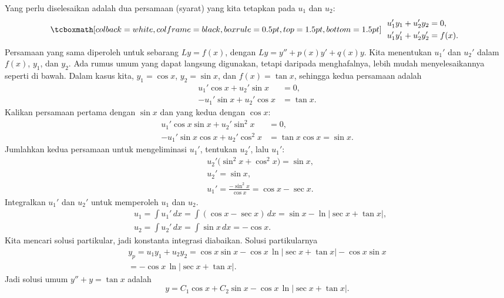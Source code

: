 Yang perlu diselesaikan adalah dua persamaan (syarat) yang kita tetapkan pada $u_1$ dan $u_2$:
\begin{equation*}
\mybxbg{~~
\begin{aligned}
& u_1' y_1 + u_2' y_2 = 0 ,\\
& u_1' y_1' + u_2' y_2' = f(x) .
\end{aligned}
~~}
\end{equation*}
Persamaan yang sama diperoleh untuk sebarang $Ly = f(x)$, dengan $Ly = y''+p(x)y'+q(x)y$. Kita menentukan $u_1'$ dan $u_2'$ dalam $f(x)$, $y_1$, dan $y_2$. Ada rumus umum yang dapat langsung digunakan, tetapi daripada menghafalnya, lebih mudah menyelesaikannya seperti di bawah. Dalam kasus kita, $y_1 = \cos x$, $y_2 = \sin x$, dan $f(x) = \tan x$, sehingga kedua persamaan adalah
\begin{equation*}
\begin{aligned}
u_1' \cos x + u_2' \sin x &= 0 ,\\
-u_1' \sin x + u_2' \cos x &= \tan x .
\end{aligned}
\end{equation*}
Kalikan persamaan pertama dengan $\sin x$ dan yang kedua dengan $\cos x$:
\begin{equation*}
\begin{aligned}
u_1' \cos x \sin x + u_2' \sin^2 x & = 0 ,\\
-u_1' \sin x \cos x + u_2' \cos^2 x & = \tan x \cos x = \sin x .
\end{aligned}
\end{equation*}
Jumlahkan kedua persamaan untuk mengeliminasi $u_1'$, tentukan $u_2'$, lalu $u_1'$:
\begin{equation*}
\begin{aligned}
& u_2' \bigl(\sin^2 x + \cos^2 x\bigr) = \sin x , \\
& u_2' = \sin x , \\
& u_1' = \frac{- \sin^2 x}{\cos x} = \cos x - \sec x .
\end{aligned}
\end{equation*}
Integralkan $u_1'$ dan $u_2'$ untuk memperoleh $u_1$ dan $u_2$.
\begin{equation*}
\begin{aligned}
& u_1 = \int u_1'\,dx
= \int ( \cos x-\sec x ) \,dx
= \sin x -
\ln \left\lvert \sec x + \tan x \right\rvert
, \\
& u_2 = \int u_2'\,dx
= \int \sin x\,dx = -\cos x .
\end{aligned}
\end{equation*}
Kita mencari solusi partikular, jadi konstanta integrasi diabaikan. Solusi partikularnya
\begin{multline*}
y_p = u_1 y_1 + u_2 y_2 =
\cos x \sin x
-
\cos x
\,
\ln \lvert
\sec x + \tan x
\rvert
-\cos x \sin x
\\ =
-
\cos x \, \ln \lvert
\sec x + \tan x
\rvert .
\end{multline*}
Jadi solusi umum $y'' + y = \tan x$ adalah
\begin{equation*}
y = C_1 \cos x + C_2 \sin x
-
\cos x \, \ln \lvert
\sec x + \tan x
\rvert .
\end{equation*}

